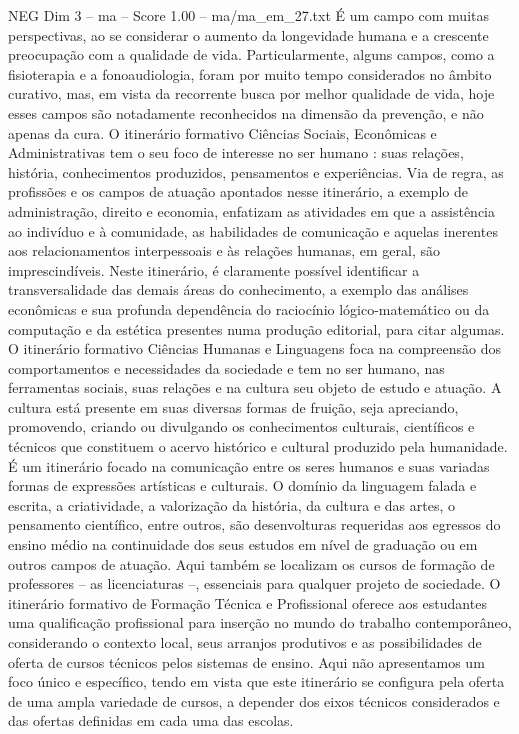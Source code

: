 \begin{textsample}{NEG Dim 3 – ma – Score 1.00 – ma/ma\_em\_27.txt}
É um campo com muitas perspectivas, ao se considerar o aumento da longevidade humana e a crescente preocupação com a qualidade de vida.
Particularmente, alguns campos, como a fisioterapia e a fonoaudiologia, foram por muito tempo considerados no âmbito curativo, mas, em vista da recorrente busca por melhor qualidade de vida, hoje esses campos são notadamente reconhecidos na dimensão da prevenção, e não apenas da cura.
O itinerário formativo Ciências Sociais, Econômicas e Administrativas tem o seu foco de interesse no ser humano : suas relações, história, conhecimentos produzidos, pensamentos e experiências.
Via de regra, as profissões e os campos de atuação apontados nesse itinerário, a exemplo de administração, direito e economia, enfatizam as atividades em que a assistência ao indivíduo e à comunidade, as habilidades de comunicação e aquelas inerentes aos relacionamentos interpessoais e às relações humanas, em geral, são imprescindíveis.
Neste itinerário, é claramente possível identificar a transversalidade das demais áreas do conhecimento, a exemplo das análises econômicas e sua profunda dependência do raciocínio lógico-matemático ou da computação e da estética presentes numa produção editorial, para citar algumas.
O itinerário formativo Ciências Humanas e Linguagens foca na compreensão dos comportamentos e necessidades da sociedade e tem no ser humano, nas ferramentas sociais, suas relações e na cultura seu objeto de estudo e atuação.
A cultura está presente em suas diversas formas de fruição, seja apreciando, promovendo, criando ou divulgando os conhecimentos culturais, científicos e técnicos que constituem o acervo histórico e cultural produzido pela humanidade.
É um itinerário focado na comunicação entre os seres humanos e suas variadas formas de expressões artísticas e culturais.
O domínio da linguagem falada e escrita, a criatividade, a valorização da história, da cultura e das artes, o pensamento científico, entre outros, são desenvolturas requeridas aos egressos do ensino médio na continuidade dos seus estudos em nível de graduação ou em outros campos de atuação.
Aqui também se localizam os cursos de formação de professores – as licenciaturas –, essenciais para qualquer projeto de sociedade.
O itinerário formativo de Formação Técnica e Profissional oferece aos estudantes uma qualificação profissional para inserção no mundo do trabalho contemporâneo, considerando o contexto local, seus arranjos produtivos e as possibilidades de oferta de cursos técnicos pelos sistemas de ensino.
Aqui não apresentamos um foco único e específico, tendo em vista que este itinerário se configura pela oferta de uma ampla variedade de cursos, a depender dos eixos técnicos considerados e das ofertas definidas em cada uma das escolas.

\end{textsample}
